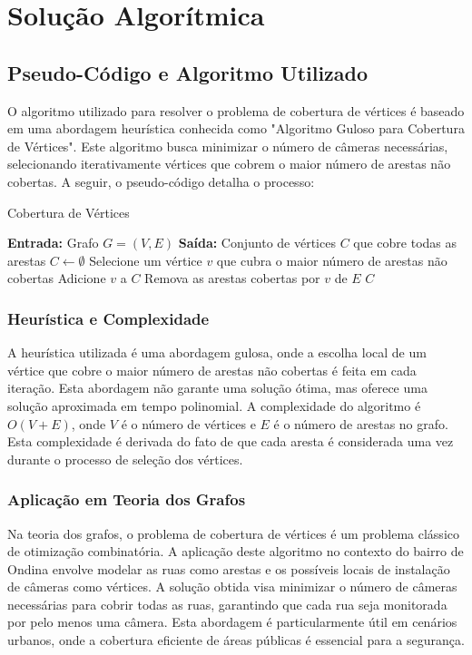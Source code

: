 \documentclass[12pt, a4paper]{report}
\begin{document}
\chapter{Solução Algorítmica}

\section{Pseudo-Código e Algoritmo Utilizado}
O algoritmo utilizado para resolver o problema de cobertura de vértices é baseado em uma abordagem heurística conhecida como "Algoritmo Guloso para Cobertura de Vértices". Este algoritmo busca minimizar o número de câmeras necessárias, selecionando iterativamente vértices que cobrem o maior número de arestas não cobertas. A seguir, o pseudo-código detalha o processo:

\begin{algorithm}
\caption{Cobertura de Vértices}
\begin{algorithmic}[1]
\State \textbf{Entrada:} Grafo \(G = (V, E)\)
\State \textbf{Saída:} Conjunto de vértices \(C\) que cobre todas as arestas
\State \(C \gets \emptyset\)
    \State Selecione um vértice \(v\) que cubra o maior número de arestas não cobertas
    \State Adicione \(v\) a \(C\)
    \State Remova as arestas cobertas por \(v\) de \(E\)
\EndWhile
\State \Return \(C\)
\end{algorithmic}
\end{algorithm}

\subsection{Heurística e Complexidade}
A heurística utilizada é uma abordagem gulosa, onde a escolha local de um vértice que cobre o maior número de arestas não cobertas é feita em cada iteração. Esta abordagem não garante uma solução ótima, mas oferece uma solução aproximada em tempo polinomial. A complexidade do algoritmo é \(O(V + E)\), onde \(V\) é o número de vértices e \(E\) é o número de arestas no grafo. Esta complexidade é derivada do fato de que cada aresta é considerada uma vez durante o processo de seleção dos vértices.

\subsection{Aplicação em Teoria dos Grafos}
Na teoria dos grafos, o problema de cobertura de vértices é um problema clássico de otimização combinatória. A aplicação deste algoritmo no contexto do bairro de Ondina envolve modelar as ruas como arestas e os possíveis locais de instalação de câmeras como vértices. A solução obtida visa minimizar o número de câmeras necessárias para cobrir todas as ruas, garantindo que cada rua seja monitorada por pelo menos uma câmera. Esta abordagem é particularmente útil em cenários urbanos, onde a cobertura eficiente de áreas públicas é essencial para a segurança.
\end{document}
